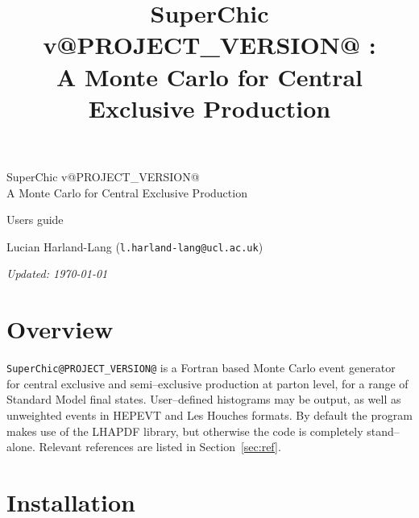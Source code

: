 \documentclass[12pt]{article}
\title{SuperChic v@PROJECT_VERSION@ : \\ \vspace{0.5cm}A Monte Carlo for Central Exclusive Production}
\begin{document}
\begin{titlepage}
\begin{center}

{\huge SuperChic v@PROJECT_VERSION@} \\ \vspace{0.5cm} {\Large A Monte Carlo for Central Exclusive Production}

\vspace{3cm}

{\huge Users guide}

\vspace{3cm}

\large{ Lucian Harland-Lang (\texttt{l.harland-lang@ucl.ac.uk})}

\vspace{3cm}
{\small \emph{Updated: \today}}

\end{center}
\end{titlepage}

\clearpage

\tableofcontents

\clearpage

\section{Overview}

\texttt{SuperChic@PROJECT_VERSION@} is a Fortran based Monte Carlo event generator for central exclusive and semi--exclusive production at parton level, for a range of Standard Model final states. User--defined histograms may be output, as well as unweighted events in HEPEVT and Les Houches formats. By default the program makes use of the LHAPDF library, but otherwise the code is completely stand--alone. Relevant references are listed in Section~\ref{sec:ref}.

\section{Installation}
\end{document}

